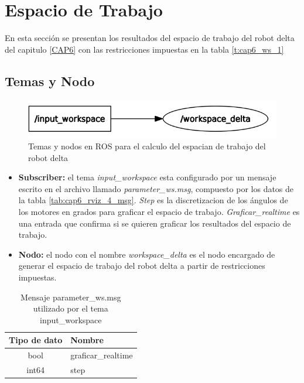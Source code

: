 \newpage


\section{Espacio de Trabajo}
        En esta sección se presentan los resultados del espacio de trabajo del robot delta del capitulo \eqref{CAP6} con las restricciones impuestas en la tabla \eqref{t:cap6_ws_1}
        
    \subsection{Temas y Nodo}
    
        \begin{figure}[h]
            \centering
            \includegraphics[width=1.0\linewidth]{Main/Chapter7/Images7/nodo_2.png}
            \caption{Temas y nodos en ROS para el calculo del espacian de trabajo del robot delta}
            \label{f:cap7_rviz2222}
        \end{figure}    
    
    \begin{itemize}
        \item {\textbf{Subscriber:}  el tema \textit{input\_workspace} esta configurado por un mensaje escrito en el archivo llamado \textit{parameter\_ws.msg}, compuesto por los datos de la tabla \eqref{tab:cap6_rviz_4_msg}. \textit{Step} es la discretizacion de los ángulos de los motores en grados para graficar el espacio de trabajo. \textit{Graficar\_realtime} es una entrada que confirma si se quieren graficar los resultados del espacio de trabajo. }
        \item {\textbf{Nodo:} el nodo con el nombre \textit{workspace\_delta} es el nodo encargado de generar el espacio de trabajo del robot delta a partir de restricciones impuestas.}
    \end{itemize}
    
        
            \begingroup
            \renewcommand{\arraystretch}{2.0}
            \begin{table}[H]
                \centering
                \begin{tabular}{c m{3.0cm}}
                   \hline                   
                   \textbf{Tipo de dato}  & \textbf{Nombre}    \\\hline \hline 
                    bool & graficar\_realtime
                   \\\hline
                    int64 & step
                    \\\hline                   
                \end{tabular}
                \caption{Mensaje parameter\_ws.msg utilizado por el tema input\_workspace}
                \label{tab:cap6_rviz_4_msg}
            \end{table}
        \endgroup    
        
